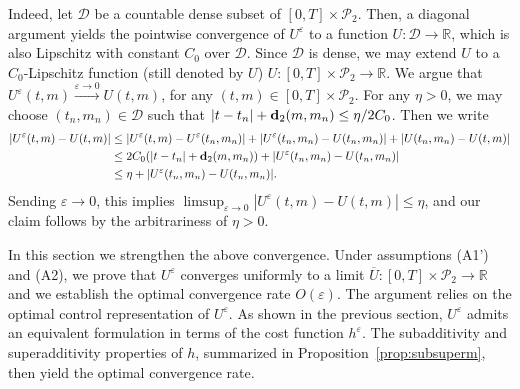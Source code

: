 \documentclass[reqno,11pt]{amsart}
\numberwithin{equation}{section}
\newcommand{\zd}[1]{{\color{brown}[ZD:#1]}}
\newcommand{\R}{\mathbb{R}} %
\newcommand{\e}{\varepsilon}
\newcommand{\ep}{\varepsilon}
\newcommand{\nd}{\noindent}
\renewcommand{\bar}{\overline}
\begin{document}
\nd
Indeed, let $\mathcal{D}$ be a countable dense subset of $[0,T]\times\mathcal{P}_2$. Then, a diagonal argument yields the pointwise convergence of $U^\e$ to a function $U\colon\mathcal{D}\to \R$, which is also Lipschitz with constant $C_0$ over $\mathcal{D}$. Since $\mathcal{D}$ is dense, we may extend $U$ to a $C_0$-Lipschitz function (still denoted by $U$) $U\colon [0,T]\times\mathcal{P}_2\to \R$. We argue that $U^\e(t,m)\xrightarrow{\e\to 0}U(t,m)$, for any $(t,m)\in[0,T]\times\mathcal{P}_2$. For any $\eta>0$, we may choose $(t_n,m_n)\in\mathcal{D}$ such that $|t-t_n|+{\bf d}_2(m,m_n)\le \eta/2C_0$. Then we write
\begin{align*}
    \left|U^\e(t,m)-U(t,m)\right|&\le |U^\e(t,m)-U^\e(t_n,m_n)|+|U^\e(t_n,m_n)-U(t_n,m_n)|+|U(t_n,m_n)-U(t,m)|\\
    &\le 2C_0(|t-t_n|+{\bf d}_2(m,m_n)) +|U^\e(t_n,m_n)-U(t_n,m_n)|\\
    &\le \eta + |U^\e(t_n,m_n)-U(t_n,m_n)|.
\end{align*}
Sending $\e\to 0$, this implies $\limsup_{\e\to 0}\left|U^\e(t,m)-U(t,m)\right|\le \eta$, and our claim follows by the arbitrariness of $\eta>0$.

\vspace{1mm}

 \nd
In this section we strengthen the above convergence. Under assumptions (A1') and (A2), we prove that $U^\varepsilon$ converges uniformly to a limit $\bar U\colon [0,T]\times \mathcal{P}_2\to \R$ and we establish the optimal convergence rate $O(\varepsilon)$. The argument relies on the optimal control representation of $U^\varepsilon$. As shown in the previous section, $U^\varepsilon$ admits an equivalent formulation in terms of the cost function $h^\ep$. The subadditivity and superadditivity properties of $h$, summarized in Proposition~\ref{prop:subsuperm}, then yield the optimal convergence rate.
\end{document}
